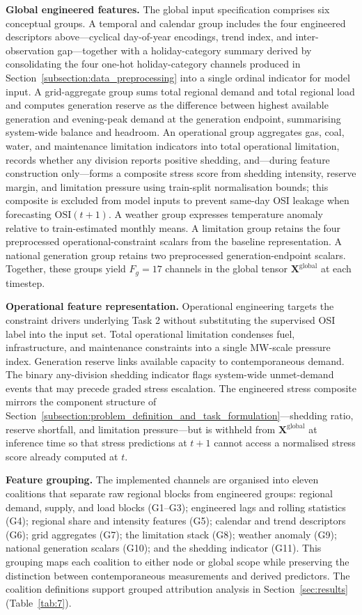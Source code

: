 \textbf{Global engineered features.} The global input specification comprises six conceptual groups. A temporal and calendar group includes the four engineered descriptors above---cyclical day-of-year encodings, trend index, and inter-observation gap---together with a holiday-category summary derived by consolidating the four one-hot holiday-category channels produced in Section~\ref{subsection:data_preprocessing} into a single ordinal indicator for model input. A grid-aggregate group sums total regional demand and total regional load and computes generation reserve as the difference between highest available generation and evening-peak demand at the generation endpoint, summarising system-wide balance and headroom. An operational group aggregates gas, coal, water, and maintenance limitation indicators into total operational limitation, records whether any division reports positive shedding, and---during feature construction only---forms a composite stress score from shedding intensity, reserve margin, and limitation pressure using train-split normalisation bounds; this composite is excluded from model inputs to prevent same-day OSI leakage when forecasting \(\mathrm{OSI}(t+1)\). A weather group expresses temperature anomaly relative to train-estimated monthly means. A limitation group retains the four preprocessed operational-constraint scalars from the baseline representation. A national generation group retains two preprocessed generation-endpoint scalars. Together, these groups yield \(F_g = 17\) channels in the global tensor \(\mathbf{X}^{\mathrm{global}}\) at each timestep.

\textbf{Operational feature representation.} Operational engineering targets the constraint drivers underlying Task 2 without substituting the supervised OSI label into the input set. Total operational limitation condenses fuel, infrastructure, and maintenance constraints into a single MW-scale pressure index. Generation reserve links available capacity to contemporaneous demand. The binary any-division shedding indicator flags system-wide unmet-demand events that may precede graded stress escalation. The engineered stress composite mirrors the component structure of Section~\ref{subsection:problem_definition_and_task_formulation}---shedding ratio, reserve shortfall, and limitation pressure---but is withheld from \(\mathbf{X}^{\mathrm{global}}\) at inference time so that stress predictions at \(t+1\) cannot access a normalised stress score already computed at \(t\).

\textbf{Feature grouping.} The implemented channels are organised into eleven coalitions that separate raw regional blocks from engineered groups: regional demand, supply, and load blocks (G1--G3); engineered lags and rolling statistics (G4); regional share and intensity features (G5); calendar and trend descriptors (G6); grid aggregates (G7); the limitation stack (G8); weather anomaly (G9); national generation scalars (G10); and the shedding indicator (G11). This grouping maps each coalition to either node or global scope while preserving the distinction between contemporaneous measurements and derived predictors. The coalition definitions support grouped attribution analysis in Section~\ref{sec:results} (Table~\ref{tab:7}).


